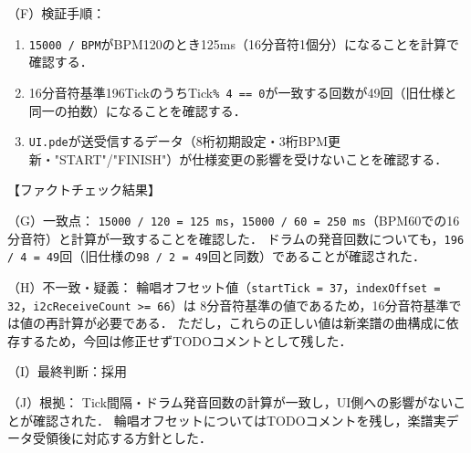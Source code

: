 \documentclass[uplatex,dvipdfmx]{jlreq}
\begin{document}
\begin{tcolorbox}[title = AI利用内容1：楽譜仕様変更の影響範囲分析, arc=3mm, colback=white, breakable]
     （F）検証手順：
     \begin{enumerate}
       \item \texttt{15000 / BPM}がBPM120のとき125ms（16分音符1個分）になることを計算で確認する．
       \item 16分音符基準196TickのうちTick\texttt{\% 4 == 0}が一致する回数が49回（旧仕様と同一の拍数）になることを確認する．
       \item \texttt{UI.pde}が送受信するデータ（8桁初期設定・3桁BPM更新・"START"/"FINISH"）が仕様変更の影響を受けないことを確認する．
     \end{enumerate}

    【ファクトチェック結果】

     （G）一致点：
     \texttt{15000 / 120 = 125 ms}，\texttt{15000 / 60 = 250 ms}（BPM60での16分音符）と計算が一致することを確認した．
     ドラムの発音回数についても，\texttt{196 / 4 = 49}回（旧仕様の\texttt{98 / 2 = 49}回と同数）であることが確認された．

     （H）不一致・疑義：
     輪唱オフセット値（\texttt{startTick = 37}，\texttt{indexOffset = 32}，\texttt{i2cReceiveCount >= 66}）は
     8分音符基準の値であるため，16分音符基準では値の再計算が必要である．
     ただし，これらの正しい値は新楽譜の曲構成に依存するため，今回は修正せずTODOコメントとして残した．

     （I）最終判断：採用

     （J）根拠：
     Tick間隔・ドラム発音回数の計算が一致し，UI側への影響がないことが確認された．
     輪唱オフセットについてはTODOコメントを残し，楽譜実データ受領後に対応する方針とした．

\end{tcolorbox}
\end{document}
